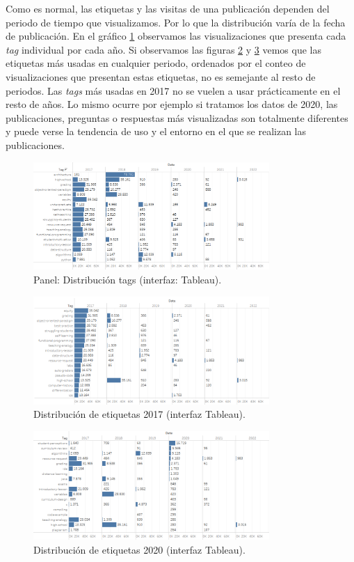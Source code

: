 \documentclass[a4paper, 12pt]{book}
\begin{document}
Como es normal, las etiquetas y las visitas de una publicación dependen del periodo de tiempo que visualizamos. Por lo que la distribución varía de la fecha de publicación. En el gráfico \ref{figura:dist_tags} observamos las visualizaciones que presenta cada \emph{tag} individual por cada año. Si observamos las figuras \ref{figura:tags_2017} y \ref{figura:tags_2020} vemos que las etiquetas más usadas en cualquier periodo, ordenados por el conteo de visualizaciones que presentan estas etiquetas, no es semejante al resto de periodos. Las \emph{tags} más usadas en 2017 no se vuelen a usar prácticamente en el resto de años. Lo mismo ocurre por ejemplo si tratamos los datos de 2020, las publicaciones, preguntas o respuestas más visualizadas son totalmente diferentes y puede verse la tendencia de uso y el entorno en el que se realizan las publicaciones. 

\begin{figure}[ht]
    \centering
    \includegraphics[width=0.8\textwidth]{img/cse/tags_distrib.png}
    \caption{Panel: Distribución tags (interfaz: Tableau).}
    \label{figura:dist_tags}
\end{figure}

\begin{figure}[ht]
    \centering
    \includegraphics[width=0.8\textwidth]{img/cse/tags_2017.png}
    \caption{ Distribución de etiquetas 2017 (interfaz Tableau).}
    \label{figura:tags_2017}
\end{figure}

\begin{figure}[ht]
    \centering
    \includegraphics[width=0.8\textwidth]{img/cse/tags_2020.png}
    \caption{ Distribución de etiquetas 2020 (interfaz Tableau).}
    \label{figura:tags_2020}
\end{figure}
\end{document}
